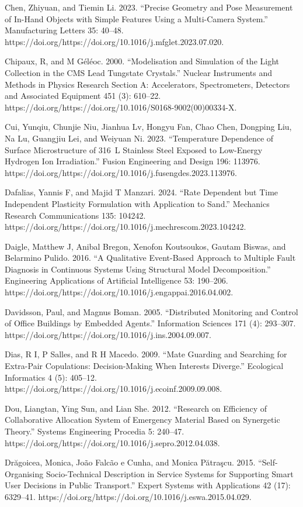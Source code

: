 \documentclass[utf8]{gradu3}
\begin{document}
Chen, Zhiyuan, and Tiemin Li. 2023. “Precise Geometry and Pose Measurement of In-Hand Objects with Simple Features Using a Multi-Camera System.” Manufacturing Letters 35: 40–48. https://doi.org/https://doi.org/10.1016/j.mfglet.2023.07.020.

Chipaux, R, and M Géléoc. 2000. “Modelisation and Simulation of the Light Collection in the CMS Lead Tungstate Crystals.” Nuclear Instruments and Methods in Physics Research Section A: Accelerators, Spectrometers, Detectors and Associated Equipment 451 (3): 610–22. https://doi.org/https://doi.org/10.1016/S0168-9002(00)00334-X.

Cui, Yunqiu, Chunjie Niu, Jianhua Lv, Hongyu Fan, Chao Chen, Dongping Liu, Na Lu, Guangjiu Lei, and Weiyuan Ni. 2023. “Temperature Dependence of Surface Microstructure of 316 L Stainless Steel Exposed to Low-Energy Hydrogen Ion Irradiation.” Fusion Engineering and Design 196: 113976. https://doi.org/https://doi.org/10.1016/j.fusengdes.2023.113976.

Dafalias, Yannis F, and Majid T Manzari. 2024. “Rate Dependent but Time Independent Plasticity Formulation with Application to Sand.” Mechanics Research Communications 135: 104242. https://doi.org/https://doi.org/10.1016/j.mechrescom.2023.104242.

Daigle, Matthew J, Anibal Bregon, Xenofon Koutsoukos, Gautam Biswas, and Belarmino Pulido. 2016. “A Qualitative Event-Based Approach to Multiple Fault Diagnosis in Continuous Systems Using Structural Model Decomposition.” Engineering Applications of Artificial Intelligence 53: 190–206. https://doi.org/https://doi.org/10.1016/j.engappai.2016.04.002.

Davidsson, Paul, and Magnus Boman. 2005. “Distributed Monitoring and Control of Office Buildings by Embedded Agents.” Information Sciences 171 (4): 293–307. https://doi.org/https://doi.org/10.1016/j.ins.2004.09.007.

Dias, R I, P Salles, and R H Macedo. 2009. “Mate Guarding and Searching for Extra-Pair Copulations: Decision-Making When Interests Diverge.” Ecological Informatics 4 (5): 405–12. https://doi.org/https://doi.org/10.1016/j.ecoinf.2009.09.008.

Dou, Liangtan, Ying Sun, and Lian She. 2012. “Research on Efficiency of Collaborative Allocation System of Emergency Material Based on Synergetic Theory.” Systems Engineering Procedia 5: 240–47. https://doi.org/https://doi.org/10.1016/j.sepro.2012.04.038.

Drăgoicea, Monica, João Falcão e Cunha, and Monica Pătraşcu. 2015. “Self-Organising Socio-Technical Description in Service Systems for Supporting Smart User Decisions in Public Transport.” Expert Systems with Applications 42 (17): 6329–41. https://doi.org/https://doi.org/10.1016/j.eswa.2015.04.029.
\end{document}
